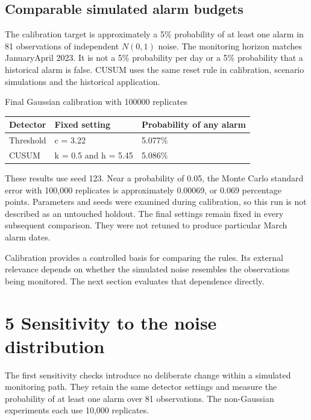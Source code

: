 \documentclass[11pt,a4paper]{article}
\newcommand{\reporttablefont}{\fontsize{9.4}{11.7}\selectfont}
\begin{document}
\subsection*{Comparable simulated alarm budgets}
The calibration target is approximately a 5\% probability of at least one alarm in 81 observations of independent $N(0,1)$ noise. The monitoring horizon matches January\textendash{}April 2023. It is not a 5\% probability per day or a 5\% probability that a historical alarm is false. CUSUM uses the same reset rule in calibration, scenario simulations and the historical application.

\begin{minipage}{\linewidth}\captionsetup{type=table}\caption{Final Gaussian calibration with 100000 replicates}\reporttablefont\renewcommand{\arraystretch}{1.22}\begin{tabular}{@{}L{0.221429\dimexpr{}\tabcolsep\relax}C{0.364286\dimexpr{}\tabcolsep\relax}C{0.414286\dimexpr{}\tabcolsep\relax}@{}}\toprule
{\sffamily\bfseries\color{navy}Detector} & {\sffamily\bfseries\color{navy}Fixed setting} & {\sffamily\bfseries\color{navy}Probability of any alarm}\\\midrule
Threshold & c = 3.22 & 5.077\%\\
CUSUM & k = 0.5 and h = 5.45 & 5.086\%\\
\bottomrule\end{tabular}\end{minipage}\par\vspace{5pt}
These results use seed 123. Near a probability of 0.05, the Monte Carlo standard error with 100,000 replicates is approximately 0.00069, or 0.069 percentage points. Parameters and seeds were examined during calibration, so this run is not described as an untouched holdout. The final settings remain fixed in every subsequent comparison. They were not retuned to produce particular March alarm dates.

Calibration provides a controlled basis for comparing the rules. Its external relevance depends on whether the simulated noise resembles the observations being monitored. The next section evaluates that dependence directly.

\clearpage
\section*{5 Sensitivity to the noise distribution}
The first sensitivity checks introduce no deliberate change within a simulated monitoring path. They retain the same detector settings and measure the probability of at least one alarm over 81 observations. The non-Gaussian experiments each use 10,000 replicates.
\end{document}
